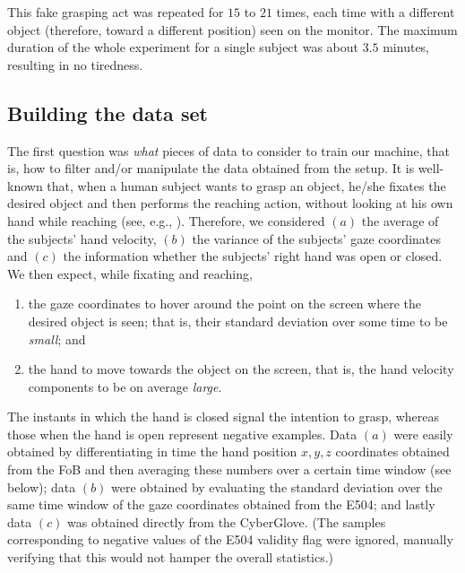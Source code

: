 \documentclass[jou,a4paper,notxfonts]{apa}
\begin{document}
This fake grasping act was repeated for $15$ to $21$ times, each time
with a different object (therefore, toward a different position) seen
on the monitor. The maximum duration of the whole experiment for a
single subject was about $3.5$ minutes, resulting in no tiredness.

\subsection{Building the data set}
\label{subsec:dataset}

The first question was \emph{what} pieces of data to consider to train
our machine, that is, how to filter and/or manipulate the data
obtained from the setup. It is well-known that, when a human subject
wants to grasp an object, he/she fixates the desired object and then
performs the reaching action, without looking at his own hand while
reaching (see, e.g., \cite{johansson01}). Therefore, we considered
$(a)$ the average of the subjects' hand velocity, $(b)$ the variance
of the subjects' gaze coordinates and $(c)$ the information whether
the subjects' right hand was open or closed. We then expect, while
fixating and reaching,

\begin{enumerate}

  \item the gaze coordinates to hover around the point on the screen
    where the desired object is seen; that is, their standard
    deviation over some time to be \emph{small}; and

  \item the hand to move towards the object on the screen, that is,
    the hand velocity components to be on average \emph{large}.

\end{enumerate}

The instants in which the hand is closed signal the intention to
grasp, whereas those when the hand is open represent negative
examples. Data $(a)$ were easily obtained by differentiating in time
the hand position $x,y,z$ coordinates obtained from the FoB and then
averaging these numbers over a certain time window (see below); data
$(b)$ were obtained by evaluating the standard deviation over the same
time window of the gaze coordinates obtained from the E504; and lastly
data $(c)$ was obtained directly from the CyberGlove. (The samples
corresponding to negative values of the E504 validity flag were
ignored, manually verifying that this would not hamper the overall
statistics.)
\end{document}

